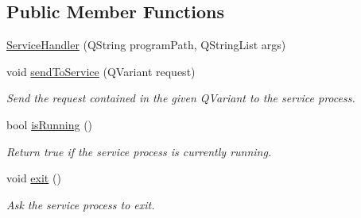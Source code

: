 \subsection*{Public Member Functions}
\begin{DoxyCompactItemize}
\item 
\hyperlink{class_gost_crypt_1_1_core_1_1_service_handler_af992d088e7f81498f241daddac1975d1}{Service\+Handler} (Q\+String program\+Path, Q\+String\+List args)
\item 
void \hyperlink{class_gost_crypt_1_1_core_1_1_service_handler_a76aab87469f628b2bd2be52b31604359}{send\+To\+Service} (Q\+Variant request)
\begin{DoxyCompactList}\small\item\em Send the request contained in the given Q\+Variant to the service process. \end{DoxyCompactList}\item 
bool \hyperlink{class_gost_crypt_1_1_core_1_1_service_handler_a769c0bd8e4b9eac2492dda34b446405c}{is\+Running} ()
\begin{DoxyCompactList}\small\item\em Return true if the service process is currently running. \end{DoxyCompactList}\item 
void \hyperlink{class_gost_crypt_1_1_core_1_1_service_handler_ac9113ccad5366959c2ea5cce7762c7cb}{exit} ()
\begin{DoxyCompactList}\small\item\em Ask the service process to exit. \end{DoxyCompactList}\end{DoxyCompactItemize}
